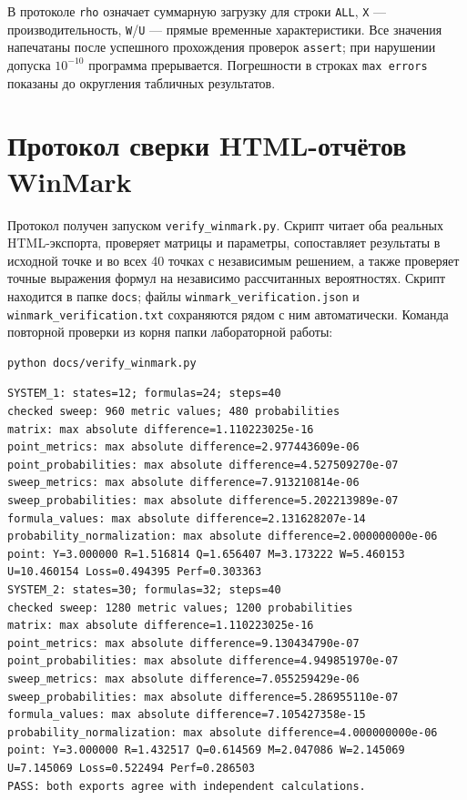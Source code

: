 \documentclass[a4paper,12pt]{article}
\begin{document}
В протоколе \texttt{rho} означает суммарную загрузку для строки \texttt{ALL}, \texttt{X} --- производительность, \texttt{W}/\texttt{U} --- прямые временные характеристики. Все значения напечатаны после успешного прохождения проверок \texttt{assert}; при нарушении допуска $10^{-10}$ программа прерывается. Погрешности в строках \texttt{max errors} показаны до округления табличных результатов.


\clearpage
\section{Протокол сверки HTML-отчётов WinMark}\label{app:marklog}
Протокол получен запуском \texttt{verify\_winmark.py}. Скрипт читает оба реальных HTML-экспорта, проверяет матрицы и параметры, сопоставляет результаты в исходной точке и во всех 40 точках с независимым решением, а также проверяет точные выражения формул на независимо рассчитанных вероятностях. Скрипт находится в папке \texttt{docs}; файлы \texttt{winmark\_verification.json} и \texttt{winmark\_verification.txt} сохраняются рядом с ним автоматически. Команда повторной проверки из корня папки лабораторной работы:
\begin{lstlisting}[language=bash,numbers=none]
python docs/verify_winmark.py
\end{lstlisting}
\begin{lstlisting}[language={},numbers=none,basicstyle=\ttfamily\scriptsize]
SYSTEM_1: states=12; formulas=24; steps=40
checked sweep: 960 metric values; 480 probabilities
matrix: max absolute difference=1.110223025e-16
point_metrics: max absolute difference=2.977443609e-06
point_probabilities: max absolute difference=4.527509270e-07
sweep_metrics: max absolute difference=7.913210814e-06
sweep_probabilities: max absolute difference=5.202213989e-07
formula_values: max absolute difference=2.131628207e-14
probability_normalization: max absolute difference=2.000000000e-06
point: Y=3.000000 R=1.516814 Q=1.656407 M=3.173222 W=5.460153 U=10.460154 Loss=0.494395 Perf=0.303363
SYSTEM_2: states=30; formulas=32; steps=40
checked sweep: 1280 metric values; 1200 probabilities
matrix: max absolute difference=1.110223025e-16
point_metrics: max absolute difference=9.130434790e-07
point_probabilities: max absolute difference=4.949851970e-07
sweep_metrics: max absolute difference=7.055259429e-06
sweep_probabilities: max absolute difference=5.286955110e-07
formula_values: max absolute difference=7.105427358e-15
probability_normalization: max absolute difference=4.000000000e-06
point: Y=3.000000 R=1.432517 Q=0.614569 M=2.047086 W=2.145069 U=7.145069 Loss=0.522494 Perf=0.286503
PASS: both exports agree with independent calculations.
\end{lstlisting}
\end{document}

